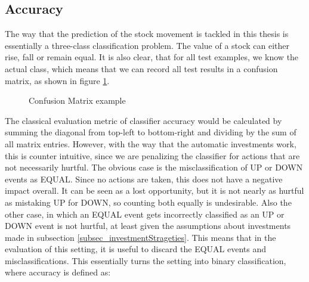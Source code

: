 \subsection{Accuracy}
The way that the prediction of the stock movement is tackled in this thesis is essentially a three-class classification problem. The value of a stock can either rise, fall or remain equal. It is also clear, that for all test examples, we know the actual class, which means that we can record all test results in a confusion matrix, as shown in figure \ref{fig_confusionMatrix}.
\\
\begin{figure}[h]
\centering
{}
\label{fig_confusionMatrix}
\caption{Confusion Matrix example}
\end{figure}

The classical evaluation metric of classifier accuracy would be calculated by summing the diagonal from top-left to bottom-right and dividing by the sum of all matrix entries. However, with the way that the automatic investments work, this is counter intuitive, since we are penalizing the classifier for actions that are not necessarily hurtful. The obvious case is the misclassification of UP or DOWN events as EQUAL. Since no actions are taken, this does not have a negative impact overall. It can be seen as a lost opportunity, but it is not nearly as hurtful as mistaking UP for DOWN, so counting both equally is undesirable. Also the other case, in which an EQUAL event gets incorrectly classified as an UP or DOWN event is not hurtful, at least given the assumptions about investments made in subsection \ref{subsec_investmentStrageties}. This means that in the evaluation of this setting, it is useful to discard the EQUAL events and misclassifications. This essentially turns the setting into binary classification, where accuracy is defined as:

